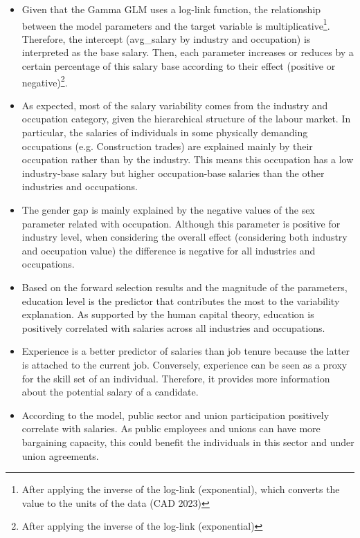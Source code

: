 \begin{itemize}
    \item Given that the Gamma GLM uses a log-link function, the relationship between the model parameters and the target variable is multiplicative\footnote{After applying the inverse of the log-link (exponential), which converts the value to the units of the data (CAD 2023)}. Therefore, the intercept (avg\_salary by industry and occupation) is interpreted as the base salary. Then, each parameter increases or reduces by a certain percentage of this salary base according to their effect (positive or negative)\footnote{After applying the inverse of the log-link (exponential)}. 

    \item As expected, most of the salary variability comes from the industry and occupation category, given the hierarchical structure of the labour market. In particular, the salaries of individuals in some physically demanding occupations (e.g. Construction trades) are explained mainly by their occupation rather than by the industry. This means this occupation has a low industry-base salary but higher occupation-base salaries than the other industries and occupations. 
    
    \item The gender gap is mainly explained by the negative values of the sex parameter related with occupation. Although this parameter is positive for industry level, when considering the overall effect (considering both industry and occupation value) the difference is negative for all industries and occupations. 
    
    \item Based on the forward selection results and the magnitude of the parameters, education level is the predictor that contributes the most to the variability explanation. As supported by the human capital theory, education is positively correlated with salaries across all industries and occupations. 
    
    \item Experience is a better predictor of salaries than job tenure because the latter is attached to the current job. Conversely, experience can be seen as a proxy for the skill set of an individual. Therefore, it provides more information about the potential salary of a candidate. 
    
    \item According to the model, public sector and union participation positively correlate with salaries. As public employees and unions can have more bargaining capacity, this could benefit the individuals in this sector and under union agreements. 
\end{itemize}

